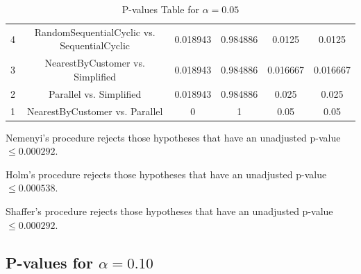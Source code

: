 \documentclass[a4paper,10pt]{article}
\begin{document}
\begin{landscape}
\begin{table}[!htp]
\begin{tabular}{cccccc}
4&RandomSequentialCyclic vs. SequentialCyclic&0.018943&0.984886&0.0125&0.0125\\
3&NearestByCustomer vs. Simplified&0.018943&0.984886&0.016667&0.016667\\
2&Parallel vs. Simplified&0.018943&0.984886&0.025&0.025\\
1&NearestByCustomer vs. Parallel&0&1&0.05&0.05\\
\hline
\end{tabular}
\caption{P-values Table for $\alpha=0.05$}
\end{table}Nemenyi's procedure rejects those hypotheses that have an unadjusted p-value $\le0.000292$.

Holm's procedure rejects those hypotheses that have an unadjusted p-value $\le0.000538$.

Shaffer's procedure rejects those hypotheses that have an unadjusted p-value $\le0.000292$.

\pagebreak

\subsection{P-values for $\alpha=0.10$}


\end{landscape}
\end{document}
